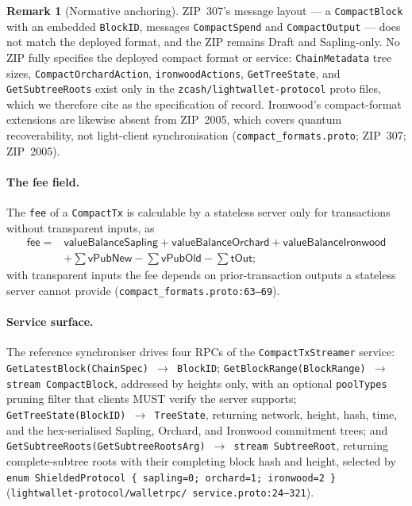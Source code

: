 \documentclass[11pt,a4paper]{article}
\theoremstyle{definition}
\newtheorem{remark}[theorem]{Remark}
\begin{document}
\begin{remark}[Normative anchoring]\label{rem:sync-spec-of-record}
ZIP~307's message layout --- a \texttt{CompactBlock} with an embedded
\texttt{BlockID}, messages \texttt{CompactSpend} and \texttt{CompactOutput}
--- does not match the deployed format, and the ZIP remains Draft and
Sapling-only. No ZIP fully specifies the deployed compact format or service:
\texttt{ChainMetadata} tree sizes, \texttt{CompactOrchardAction},
\texttt{ironwoodActions}, \texttt{GetTreeState}, and
\texttt{GetSubtreeRoots} exist only in the \texttt{zcash/lightwallet-protocol}
proto files, which we therefore cite as the specification of record.
Ironwood's compact-format extensions are likewise absent from ZIP~2005,
which covers quantum recoverability, not light-client synchronisation
(\texttt{compact\_formats.proto}; ZIP~307; ZIP~2005).
\end{remark}

\paragraph{The fee field.} The \texttt{fee} of a \texttt{CompactTx} is
calculable by a stateless server only for transactions without transparent
inputs, as
\[
\begin{aligned}
\mathsf{fee} = {} & \mathsf{valueBalanceSapling}
+ \mathsf{valueBalanceOrchard} + \mathsf{valueBalanceIronwood} \\
& + \textstyle\sum \mathsf{vPubNew} - \sum \mathsf{vPubOld}
- \sum \mathsf{tOut};
\end{aligned}
\]
with transparent inputs the fee depends on prior-transaction outputs a
stateless server cannot provide (\texttt{compact\_formats.proto:63--69}).

\paragraph{Service surface.} The reference synchroniser drives four RPCs of
the \texttt{CompactTxStreamer} service:
\texttt{GetLatestBlock(ChainSpec) $\to$ BlockID};
\texttt{GetBlockRange(BlockRange) $\to$ stream CompactBlock}, addressed by
heights only, with an optional \texttt{poolTypes} pruning filter that
clients MUST verify the server supports;
\texttt{GetTreeState(BlockID) $\to$ TreeState}, returning network, height,
hash, time, and the hex-serialised Sapling, Orchard, and Ironwood
commitment trees; and
\texttt{GetSubtreeRoots(GetSubtreeRootsArg) $\to$ stream SubtreeRoot},
returning complete-subtree roots with their completing block hash and
height, selected by \texttt{enum ShieldedProtocol \{ sapling=0; orchard=1;
ironwood=2 \}}
(\texttt{lightwallet-protocol/\allowbreak walletrpc/\allowbreak
service.proto:24--321}).
\end{document}
